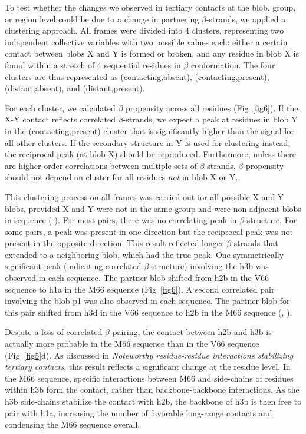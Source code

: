 \documentclass[10pt,letterpaper]{article}
\begin{document}
To test whether the changes we observed in tertiary contacts at the blob, group, or region level could be due to a change in partnering $\beta$-strands, we applied a clustering approach. All frames were divided into 4 clusters, representing two independent collective variables with two possible values each: either a certain contact between blobs X and Y is formed or broken, and any residue in blob X is found within a stretch of 4 sequential residues in $\beta$ conformation. The four clusters are thus represented as (contacting,absent), (contacting,present), (distant,absent), and (distant,present).

For each cluster, we calculated $\beta$ propensity across all residues (Fig~\ref{fig6}). If the X-Y contact reflects correlated $\beta$-strands, we expect a peak at residues in blob Y in the (contacting,present) cluster that is significantly higher than the signal for all other clusters. If the secondary structure in Y is used for clustering instead, the reciprocal peak (at blob X) should be reproduced. Furthermore, unless there are higher-order correlations between multiple sets of $\beta$-strands, $\beta$ propensity should not depend on cluster for all residues \emph{not} in blob X or Y. 

This clustering process on all frames was carried out for all possible X and Y blobs, provided X and Y were not in the same group and were non adjacent blobs in sequence (-). For most pairs, there was no correlating peak in $\beta$ structure. For some pairs, a peak was present in one direction but the reciprocal peak was not present in the opposite direction. This result reflected longer $\beta$-strands that extended to a neighboring blob, which had the true peak. One symmetrically significant peak (indicating correlated $\beta$ structure) involving the h3b was observed in each sequence. The partner blob shifted from h2b in the V66 sequence to h1a in the M66 sequence (Fig~\ref{fig6}). A second correlated pair involving the blob p1 was also observed in each sequence. The partner blob for this pair shifted from h3d in the V66 sequence to h2b in the M66 sequence (, ). 

Despite a loss of correlated $\beta$-pairing, the contact between h2b and h3b is actually more probable in the M66 sequence than in the V66 sequence (Fig~\ref{fig5}d). As discussed in \emph{Noteworthy residue-residue interactions stabilizing tertiary contacts}, this result reflects a significant change at the residue level. In the M66 sequence, specific interactions between M66 and side-chains of residues within h3b form the contact, rather than backbone-backbone interactions. As the h3b side-chains stabilize the contact with h2b, the backbone of h3b is then free to pair with h1a, increasing the number of favorable long-range contacts and condensing the M66 sequence overall.
\end{document}
